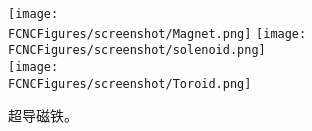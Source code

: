 \begin{figure}[htb]
\centering
\texttt{[image: \\FCNCFigures/screenshot/Magnet.png]}
\texttt{[image: \\FCNCFigures/screenshot/solenoid.png]}\\
\texttt{[image: \\FCNCFigures/screenshot/Toroid.png]}
\caption{超导磁铁。}
\label{fig:Magnet}
\end{figure}